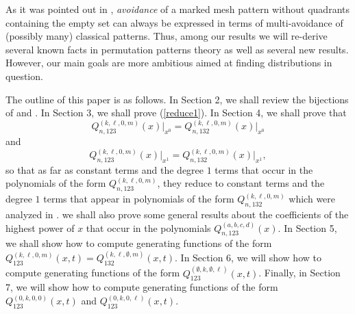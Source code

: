 \documentclass[
final,nomarks
]{dmtcs-episciences}
\newcommand{\Qmmn}[2]{Q_{#2,132}^{(#1)}(x)}
\newcommand{\Qmn}[2]{Q_{#2,123}^{(#1)}(x)}
\begin{document}
As it was pointed out in \cite{KRT1}, \emph{avoidance} of a marked mesh pattern without quadrants containing the empty set can always be expressed in terms of multi-avoidance of (possibly many) classical patterns. Thus, among our results we will re-derive several known facts in permutation patterns theory as 
well as several new results. However, our main goals are more ambitious aimed at finding  distributions in question.



The outline of this paper is as follows. In Section 2, we shall 
review the bijections of \cite{Kr} and \cite{EliDeu}. 
In Section 3, we shall prove (\ref{reduce1}).   In Section 4, we shall prove that 
\begin{equation}
\Qmn{k,\ell,0,m}{n}\big\vert_{x^0}=\Qmmn{k,\ell,0,m}{n}\big\vert_{x^0}
\end{equation}
and
\begin{equation}
\Qmn{k,\ell,0,m}{n}\big\vert_{x^1}=\Qmmn{k,\ell,0,m}{n}\big\vert_{x^1},
\end{equation}
so that as far as constant terms and the degree \begin{math}1\end{math} terms that occur in the polynomials of the form 
\begin{math}Q_{n,123}^{(k,\ell,0,m)}\end{math}, they  reduce to constant terms and the degree \begin{math}1\end{math} terms that appear in 
polynomials of the form \begin{math}Q_{n,132}^{(k,\ell,0,m)}\end{math} which were analyzed in 
\cite{KRT1,KRT2,KRT3}. we shall also prove some general results 
about the coefficients of the highest power of \begin{math}x\end{math} that occur in the polynomials 
\begin{math}Q_{n,123}^{(a,b,c,d)}(x)\end{math}. In Section 5, we shall show how to compute generating 
functions of the form \begin{math}Q_{123}^{(k,\ell,0,m)}(x,t) = Q_{132}^{(k,\ell,\emptyset,m)}(x,t)\end{math}. In Section 6, 
we will show how to compute generating functions of the form \begin{math}Q_{123}^{(\emptyset,k,\emptyset,\ell)}(x,t)\end{math}. Finally, in Section 7, 
we will show how to compute generating functions of the form \begin{math}Q_{123}^{(0,k,0,0)}(x,t)\end{math} and 
\begin{math}Q_{123}^{(0,k,0,\ell)}(x,t)\end{math}. 
\end{document}
